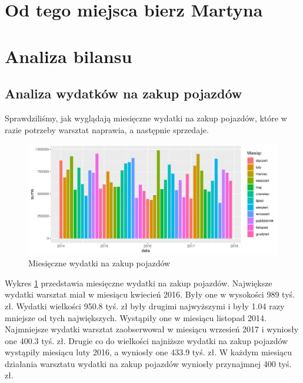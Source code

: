 \documentclass{article}\usepackage[]{graphicx}\usepackage[]{xcolor}
\makeatletter
\def\maxwidth{ %
  \ifdim\Gin@nat@width>\linewidth
    \linewidth
  \else
    \Gin@nat@width
  \fi
}
\newenvironment{knitrout}{}{} %
\makeatother
\begin{document}
\section{Od tego miejsca bierz Martyna}

\section{Analiza bilansu}

\subsection{Analiza wydatków na zakup pojazdów}

Sprawdziliśmy, jak wyglądają miesięczne wydatki na zakup pojazdów, które w razie potrzeby warsztat naprawia, a następnie sprzedaje.

\begin{knitrout}
\color{fgcolor}\begin{figure}[H]

{\centering \includegraphics[width=\maxwidth]{figure/fig_zakup_pojazdu-1} 

}

\caption[Miesięczne wydatki na zakup pojazdów]{Miesięczne wydatki na zakup pojazdów}\label{fig:fig_zakup_pojazdu}
\end{figure}

\end{knitrout}

Wykres \ref{fig:fig_zakup_pojazdu} przedstawia miesięczne wydatki na zakup pojazdów. 
Największe wydatki warsztat miał w miesiącu kwiecień 2016. Były one w wysokości 989 tyś. zł. 
Wydatki wielkości 950.8 tyś. zł były drugimi najwyższymi i były 1.04 razy mniejsze od tych największych. Wystąpiły one w miesiącu listopad 2014.
Najmniejsze wydatki warsztat zaobserwował w miesiącu wrzesień 2017 i wyniosły one 400.3 tyś. zł. 
Drugie co do wielkości najniższe wydatki na zakup pojazdów wystąpiły miesiącu luty 2016, a wyniosły one 433.9 tyś. zł.
W każdym miesiącu działania warsztatu wydatki na zakup pojazdów wyniosły przynajmnej 400 tyś. zł.
\end{document}
